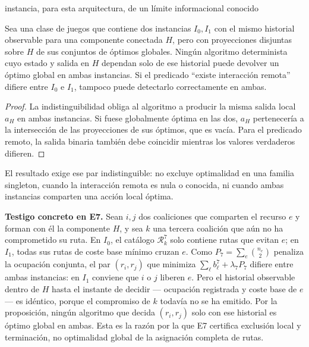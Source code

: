 \begin{contribucion}{instancia, para esta arquitectura, de un límite informacional conocido}
\begin{proposicion}
\label{prop:pre-cross-partition-limit}
Sea una clase de juegos que contiene dos instancias $I_0,I_1$ con el mismo historial observable para una componente conectada $H$, pero con proyecciones disjuntas sobre $H$ de sus conjuntos de óptimos globales. Ningún algoritmo determinista cuyo estado y salida en $H$ dependan solo de ese historial puede devolver un óptimo global en ambas instancias. Si el predicado ``existe interacción remota'' difiere entre $I_0$ e $I_1$, tampoco puede detectarlo correctamente en ambas.
\end{proposicion}
\begin{proof}
La indistinguibilidad obliga al algoritmo a producir la misma salida local $a_H$ en ambas instancias. Si fuese globalmente óptima en las dos, $a_H$ pertenecería a la intersección de las proyecciones de sus óptimos, que es vacía. Para el predicado remoto, la salida binaria también debe coincidir mientras los valores verdaderos difieren.
\end{proof}
El resultado exige ese par indistinguible: no excluye optimalidad en una familia singleton, cuando la interacción remota es nula o conocida, ni cuando ambas instancias comparten una acción local óptima.

\textbf{Testigo concreto en E7.} Sean $i,j$ dos coaliciones que comparten el
recurso $e$ y forman con él la componente $H$, y sea $k$ una tercera coalición
que aún no ha comprometido su ruta. En $I_0$, el catálogo $\mathcal R_k^7$ solo
contiene rutas que evitan $e$; en $I_1$, todas sus rutas de coste base mínimo
cruzan $e$. Como $P_7=\sum_e\binom{n_e}{2}$ penaliza la ocupación conjunta, el
par $(r_i,r_j)$ que minimiza $\sum_\ell b^7_\ell+\lambda_7P_7$ difiere entre
ambas instancias: en $I_1$ conviene que $i$ o $j$ liberen $e$. Pero el
historial observable dentro de $H$ hasta el instante de decidir --- ocupación
registrada y coste base de $e$ --- es idéntico, porque el compromiso de $k$
todavía no se ha emitido. Por la proposición, ningún algoritmo que decida
$(r_i,r_j)$ solo con ese historial es óptimo global en ambas. Esta es la razón
por la que E7 certifica exclusión local y terminación, no optimalidad global
de la asignación completa de rutas.
\end{contribucion}

